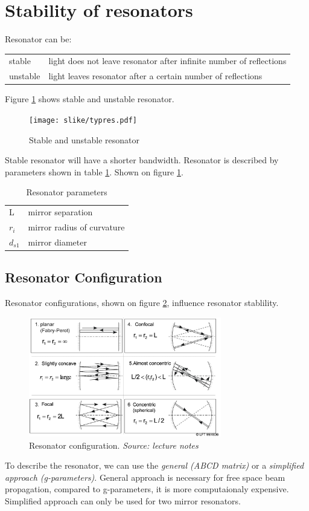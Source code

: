 \section{Stability of resonators}
Resonator can be:
\begin{table}[h!]
    \begin{tabular}{l p{5in}}
        stable & light does not leave resonator after infinite number of reflections\\
        unstable & light leaves resonator after a certain number of reflections
    \end{tabular}
\end{table}

Figure \ref{fig:resstab} shows stable and unstable resonator.
\begin{figure}[h!]
    \centering
    \texttt{[image: slike/typres.pdf]}
    \caption{Stable and unstable resonator}
    \label{fig:resstab}
\end{figure}

Stable resonator will have a shorter bandwidth. Resonator is described by parameters shown in table \ref{tab:resparms}. Shown on figure 
\ref{fig:resstab}.
\begin{table}[h!]
    \centering
    \begin{tabular}{|l| p{2in}|}
        \hline
        L & mirror separation \\
        $r_i$ & mirror radius of curvature\\
        $d_{s1}$ & mirror diameter \\
        \hline
    \end{tabular}
    \caption{Resonator parameters}
    \label{tab:resparms}
\end{table}

\subsection{Resonator Configuration}
Resonator configurations, shown on figure \ref{fig:resconf}, influence resonator stablility.
\begin{figure}[h!]
    \centering
    \includegraphics[width=0.75\textwidth]{slike/res_configs.png}
    \caption{Resonator configuration. \textit{Source: lecture notes} }
    \label{fig:resconf}
\end{figure}
To describe the resonator, we can use the \textit{general (ABCD matrix)} or a \textit{simplified approach (g-parameters)}.
General approach is necessary for free space beam propagation, compared to g-parameters, it is more computaionaly expensive.
Simplified approach can only be used for two mirror resonators.

